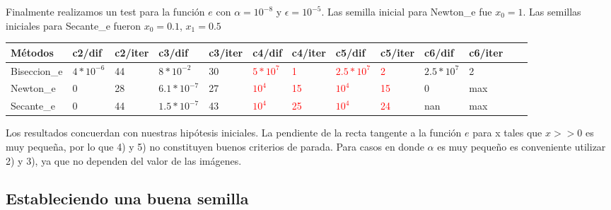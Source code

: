 Finalmente realizamos un test para la función $e$ con $\alpha = 10^{-8}$ y $\epsilon = 10^{-5}$. Las semilla inicial para Newton\_e fue $x_{0}=1$. Las semillas iniciales para Secante\_e fueron $x_{0} = 0.1$, 
$x_{1} = 0.5$

\begin{center}
    \small{
    \begin{tabular}{| l | l | l | l | l | l | l | l | l | l | l | l | l |}
    \hline
    Métodos & c2/dif & c2/iter & c3/dif & c3/iter & c4/dif & c4/iter & c5/dif & c5/iter & c6/dif & c6/iter \\ \hline
    Biseccion\_e & $4*10^{-6}$ & 44 & $8*10^{-2}$ & 30 & \textcolor{red}{$5*10^{7}$} & \textcolor{red}{1} & \textcolor{red}{$2.5*10^{7}$} & \textcolor{red}{2} & {$2.5*10^{7}$} & 2  \\ \hline
    Newton\_e & 0 & 28 & $6.1*10^{-7}$ & 27 & \textcolor{red}{$10^{4}$} & \textcolor{red}{15} & \textcolor{red}{$10^{4}$} & \textcolor{red}{15} & 0 & max \\ \hline
    Secante\_e & 0 & 44 & $1.5*10^{-7}$ & 43 & \textcolor{red}{$10^{4}$} & \textcolor{red}{25} & \textcolor{red}{$10^{4}$} & \textcolor{red}{24} & nan & max   \\ \hline
    \end{tabular}
    }
\end{center}

Los resultados concuerdan con nuestras hipótesis iniciales. La pendiente de la recta tangente a la función $e$ para x tales que $x >> 0$ es muy peque\~na, por lo que 4) y 5) no constituyen buenos
criterios de parada. Para casos en donde $\alpha$ es muy peque\~no es conveniente utilizar 2) y 3), ya que no dependen del valor de las imágenes.

\subsection{Estableciendo una buena semilla}

